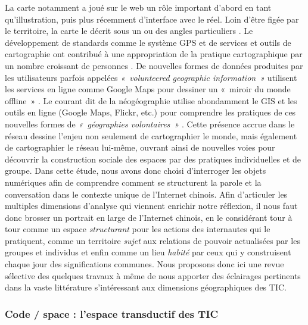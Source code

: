 La carte notamment a joué sur le web un rôle important d’abord en tant qu’illustration, puis plus récemment d’interface avec le réel. Loin d’être figée par le territoire, la carte le décrit sous un ou des angles particuliers \citep{Brunet1987, Jacob1992}. Le développement de standards comme le système GPS \citep{Haklay2008} et de services et outils de cartographie ont contribué à une appropriation de la pratique cartographique par un nombre croissant de personnes \citep{Crampton2009}. De nouvelles formes de données produites par les utilisateurs parfois appelées \textit{« volunteered geographic information »} \citep{Elwood2008} utilisent les services en ligne comme Google Maps pour dessiner un « miroir du monde offline » \citep{Graham2011}. Le courant dit de la néogéographie utilise abondamment le GIS et les outils en ligne (Google Maps, Flickr, etc.) pour comprendre les pratiques de ces nouvelles formes de \textit{« géographies volontaires »} \citep{Turner2006}. Cette présence accrue dans le réseau dessine l’enjeu non seulement de cartographier le monde, mais également de cartographier le réseau lui-même, ouvrant ainsi de nouvelles voies pour découvrir la construction sociale des espaces par des pratiques individuelles et de groupe. Dans cette étude, nous avons donc choisi d’interroger les objets numériques afin de comprendre comment se structurent la parole et la conversation dans le contexte unique de l’Internet chinois. Afin d’articuler les multiples dimensions d’analyse qui viennent enrichir notre réflexion, il nous faut donc brosser un portrait en large de l’Internet chinois, en le considérant tour à tour comme un espace \textit{structurant} pour les actions des internautes qui le pratiquent, comme un territoire \textit{sujet} aux relations de pouvoir actualisées par les groupes et individus et enfin comme un lieu \textit{habité} par ceux qui y construisent chaque jour des significations communes. Nous proposons donc ici une revue sélective des quelques travaux à même de nous apporter des éclairages pertinents dans la vaste littérature s’intéressant aux dimensions géographiques des TIC.

\subsubsection[Code / space : l’espace transductif des TIC]{Code / space : l’espace transductif des TIC}

